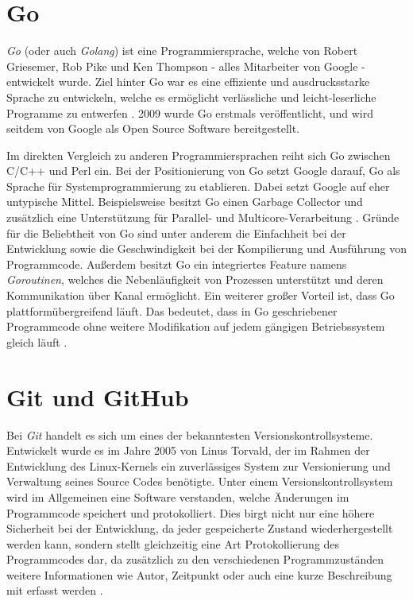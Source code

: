 \section{Go}
\textit{Go} (oder auch \textit{Golang}) ist eine Programmiersprache, welche von
Robert Griesemer, Rob Pike und Ken Thompson - alles Mitarbeiter von Google -
entwickelt wurde. Ziel hinter Go war es eine effiziente und ausdrucksstarke
Sprache zu entwickeln, welche es ermöglicht verlässliche und leicht-leserliche
Programme zu entwerfen \autocite{donovan_kernighan_2016}.
2009 wurde Go erstmals veröffentlicht, und wird seitdem von Google als Open Source
Software bereitgestellt. \newline

Im direkten Vergleich zu anderen Programmiersprachen reiht sich Go zwischen
C/C++ und Perl ein. Bei der Positionierung von Go setzt Google darauf, Go als
Sprache für Systemprogrammierung zu etablieren. Dabei setzt Google auf eher
untypische Mittel. Beispielsweise besitzt Go einen Garbage Collector und zusätzlich eine
Unterstützung für Parallel- und Multicore-Verarbeitung
\autocite{feike_blass_2012}. \newline 
Gründe für die Beliebtheit von Go sind unter anderem die Einfachheit bei der
Entwicklung sowie die Geschwindigkeit bei der Kompilierung und
Ausführung von Programmcode. Außerdem besitzt Go ein integriertes Feature namens
\textit{Goroutinen}, welches die Nebenläufigkeit von Prozessen unterstützt und
deren Kommunikation über Kanal ermöglicht. 
Ein weiterer großer Vorteil ist, dass Go plattformübergreifend läuft. Das bedeutet,
dass in Go geschriebener Programmcode ohne weitere Modifikation auf jedem
gängigen Betriebssystem gleich läuft \autocite{donovan_kernighan_2016}.


\section{Git und GitHub}
Bei \textit{Git} handelt es sich um eines der bekanntesten
Versionskontrollsysteme. Entwickelt wurde es im Jahre 2005 von Linus Torvald,
der im Rahmen der Entwicklung des Linux-Kernels ein zuverlässiges System zur
Versionierung und Verwaltung seines Source Codes benötigte. Unter einem
Versionskontrollsystem wird im Allgemeinen eine Software verstanden, welche
Änderungen im Programmcode speichert und protokolliert. Dies birgt nicht nur
eine höhere Sicherheit bei der Entwicklung, da jeder gespeicherte Zustand
wiederhergestellt werden kann, sondern stellt gleichzeitig eine Art
Protokollierung des Programmcodes dar, da zusätzlich zu den verschiedenen
Programmzuständen weitere Informationen wie Autor, Zeitpunkt oder auch eine
kurze Beschreibung mit erfasst werden \autocite{preissel_stachmann_2017}. \hfill
\break 

